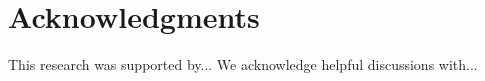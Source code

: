 \documentclass[draft]{agujournal2025}
\begin{document}
\section*{Acknowledgments}
This research was supported by... We acknowledge helpful discussions with...



%
\end{document}
